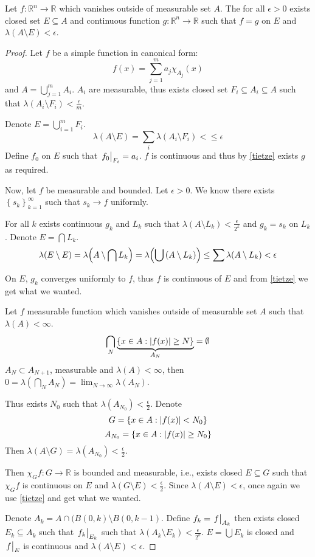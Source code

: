 \begin{theorem}
	Let $f: \mathbb{R}^n \to \mathbb{R}$ which vanishes outside of measurable set $A$. The for all $\epsilon >0$ exists closed set $E\subseteq A$ and continuous function $g: \mathbb{R}^n \to \mathbb{R}$ such that $f=g$ on $E$ and $\lambda(A\setminus E) < \epsilon$.
	\begin{proof}
		Let $f$ be a simple function in canonical form:
		$$f(x) = \sum_{j=1}^m a_j \chi_{A_j}(x)$$
		and $A = \bigcup_{j=1}^m A_i$. $A_i$ are measurable, thus exists closed set $F_i \subseteq A_i \subseteq A$ such that $\lambda(A_i\setminus F_i) < \frac{\epsilon}{m}$.
		
		Denote $E= \bigcup_{i=1}^m F_i$. 
		$$\lambda(A\setminus E) =\sum_i \lambda(A_i\setminus F_i)  < \leq \epsilon$$
		Define $f_0$ on $E$ such that $\eval{f_0}_{F_i}=a_i$. $f$ is continuous and thus by \ref{tietze} exists $g$ as required.
		
		
		Now, let $f$ be measurable and bounded. Let $\epsilon>0$. We know there exists $\left\{ s_k\right\}_{k=1}^\infty$ such that $s_k \to f$ uniformly. 
		
		For all $k$ exists continuous $g_k$ and $L_k$ such that $\lambda(A\setminus L_k) <\frac{\epsilon}{2^k}$ and $g_k=s_k$ on $L_k$. Denote $E = \bigcap L_k$.
		$$\lambda(E\setminus E) = \lambda\qty(A\setminus \bigcap L_k) = \lambda\qty(\bigcup \qty(A\setminus  L_k)) \leq \sum \lambda(A\setminus L_k) < \epsilon$$
		
		On $E$, $g_k$ converges uniformly to $f$, thus $f$ is continuous of $E$ and from \ref{tietze} we get what we wanted.
		
		Let $f$ measurable function which vanishes outside of measurable set $A$ such that $\lambda(A) < \infty$.
		$$\bigcap_N \underbrace{\left\{  x\in A : \abs{f(x)} \geq N \right\}}_{A_N} = \emptyset$$
		$A_N\subset A_{N+1}$, measurable and $\lambda(A) < \infty$, then $0=\lambda(\bigcap_N A_N) = \lim_{N\to \infty} \lambda(A_N)$.
		
		Thus exists $N_0$ such that $\lambda(A_{N_0}) <\frac{\epsilon}{2}$. Denote
		$$G = \left\{ x\in A : \abs{f(x)} < N_0 \right\}$$
		$$A_{N_0} = \left\{ x\in A : \abs{f(x)} \geq N_0 \right\}$$
		Then $\lambda(A\setminus G) =\lambda( A_{N_0} ) < \frac{\epsilon}{2}$.
		
		Then $\chi_G f: G\to \mathbb{R}$ is bounded and measurable, i.e., exists closed $E\subseteq G$ such that $\chi_G f$ is continuous on $E$ and $\lambda(G\setminus E) <\frac{\epsilon}{2}$. Since $\lambda(A\setminus E) < \epsilon$, once again we use \ref{tietze} and get what we wanted. 
		
		Denote $A_k = A\cap (B(0,k) \setminus B(0,k-1)$. Define $f_k =\eval{f}_{A_k}$ then exists closed $E_k\subseteq A_k$ such that $\eval{f_k}_{E_k}$ such that $\lambda(A_k\setminus E_k)  < \frac{\epsilon}{2^k}$. $E=\bigcup E_k$ is closed and $\eval{f}_E$ is continuous and $\lambda(A\setminus E) < \epsilon$.
		\end{proof}
\end{theorem}